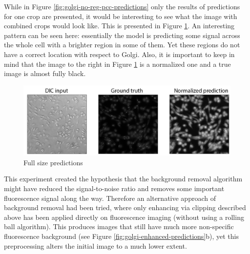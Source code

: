 While in Figure \ref{fig:golgi-no-reg-pcc-predictions} only the results of predictions for one crop are presented, it would be interesting to see what the image with combined crops would look like. This is presented in Figure \ref{fig:golgi-no-reg-pcc-predictions-full}. An interesting pattern can be seen here: essentially the model is predicting some signal across the whole cell with a brighter region in some of them. Yet these regions do not have a correct location with respect to Golgi. Also, it is important to keep in mind that the image to the right in Figure \ref{fig:golgi-no-reg-pcc-predictions-full} is a normalized one and a true image is almost fully black. 
\begin{figure}[htb]
	\begin{center}
		\includegraphics[width=0.8\linewidth]{bilder/golgi/full-img.png}
		\caption{Full size predictions}\label{fig:golgi-no-reg-pcc-predictions-full}
	\end{center}
\end{figure}

This experiment created the hypothesis that the background removal algorithm might have reduced the signal-to-noise ratio and removes some important fluorescence signal along the way. Therefore an alternative approach of background removal had been tried, where only enhancing via clipping described above has been applied directly on fluorescence imaging (without using a rolling ball algorithm). This produces images that still have much more non-specific fluorescence background (see Figure \ref{fig:golgi-enhanced-predictions}b), yet this preprocessing alters the initial image to a much lower extent. 

